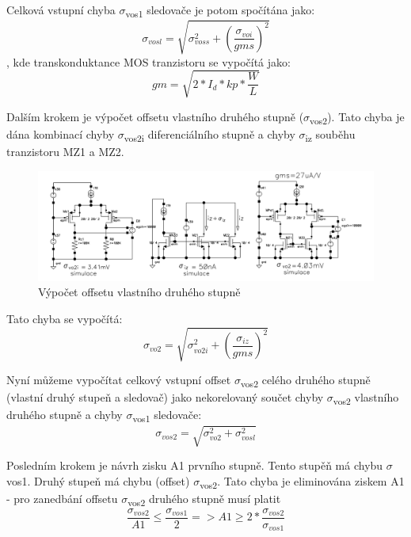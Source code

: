 Celková vstupní chyba $\sigma$\textsubscript{vos1} sledovače je potom spočítána jako:
\begin{equation}
\sigma_{vosl}=\sqrt{\sigma_{voss}^2+(\frac{\sigma_{voi}}{gms})^2}
\end{equation}
, kde transkonduktance MOS tranzistoru se vypočítá jako:
\begin{equation}
gm = \sqrt{2*I_{d}*kp*\frac{W}{L}}
\end{equation}

Dalším krokem je výpočet offsetu vlastního druhého stupně ($\sigma$\textsubscript{vos2}). Tato chyba je dána kombinací chyby $\sigma$\textsubscript{vos2i} diferenciálního stupně a chyby $\sigma$\textsubscript{iz} souběhu tranzistoru MZ1 a MZ2.

\begin{figure}[h]
   \begin{center}
     \includegraphics[scale=0.5]{images/offset2.png}
   \end{center}
   \caption{Výpočet offsetu vlastního druhého stupně}
\end{figure}
\pagebreak
Tato chyba se vypočítá:
\begin{equation}
\sigma_{vo2}=\sqrt{\sigma_{vo2i}^2+(\frac{\sigma_{iz}}{gms})^2}
\end{equation}

Nyní můžeme vypočítat celkový vstupní offset $\sigma$\textsubscript{vos2} celého druhého stupně (vlastní druhý stupeň a sledovač) jako nekorelovaný součet chyby $\sigma$\textsubscript{vos2} vlastního druhého stupně a chyby $\sigma$\textsubscript{vos1} sledovače:
\begin{equation}
\sigma_{vos2}=\sqrt{\sigma_{vo2}^2+\sigma_{vosl}^2}
\end{equation}

Posledním krokem je návrh zisku A1 prvního stupně. Tento stupěň má chybu $\sigma$vos1. Druhý stupeň má chybu (offset) $\sigma$\textsubscript{vos2}. Tato chyba je eliminována ziskem A1 - pro zanedbání offsetu $\sigma$\textsubscript{vos2} druhého stupně musí platit
\begin{equation}
\frac{\sigma_{vos2}}{A1}\leq\frac{\sigma_{vos1}}{2} => A1\geq2*\frac{\sigma_{vos2}}{\sigma_{vos1}}
\end{equation}

